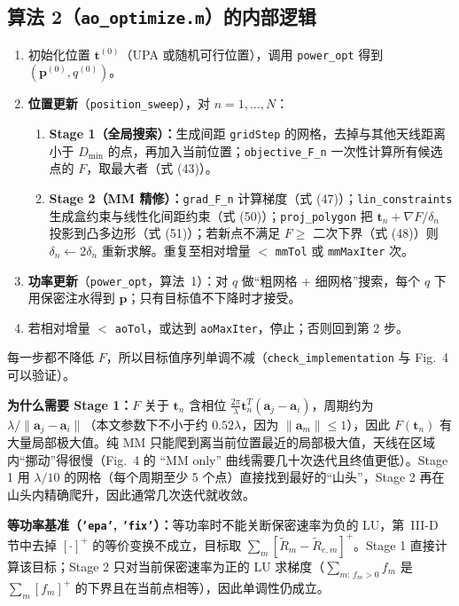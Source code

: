\documentclass[11pt,a4paper]{ctexart}
\newcommand{\code}[1]{\texttt{#1}}
\newcommand{\bt}{\mathbf t}
\begin{document}
\subsection{算法 2（\code{ao\_optimize.m}）的内部逻辑}
\begin{enumerate}
\item 初始化位置 $\bt^{(0)}$（UPA 或随机可行位置），调用 \code{power\_opt} 得到 $(\mathbf p^{(0)},q^{(0)})$。
\item \textbf{位置更新}（\code{position\_sweep}），对 $n=1,\dots,N$：
  \begin{enumerate}
  \item \textbf{Stage 1（全局搜索）：}生成间距 \code{gridStep} 的网格，去掉与其他天线距离小于 $D_{\min}$ 的点，再加入当前位置；\code{objective\_F\_n} 一次性计算所有候选点的 $F$，取最大者（式 (43)）。
  \item \textbf{Stage 2（MM 精修）：}\code{grad\_F\_n} 计算梯度（式 (47)）；\code{lin\_constraints} 生成盒约束与线性化间距约束（式 (50)）；\code{proj\_polygon} 把 $\bt_n+\nabla F/\delta_n$ 投影到凸多边形（式 (51)）；若新点不满足 $F\ge$ 二次下界（式 (48)）则 $\delta_n\leftarrow2\delta_n$ 重新求解。重复至相对增量 $<$ \code{mmTol} 或 \code{mmMaxIter} 次。
  \end{enumerate}
\item \textbf{功率更新}（\code{power\_opt}，算法~1）：对 $q$ 做“粗网格 + 细网格”搜索，每个 $q$ 下用保密注水得到 $\mathbf p$；只有目标值不下降时才接受。
\item 若相对增量 $<$ \code{aoTol}，或达到 \code{aoMaxIter}，停止；否则回到第 2 步。
\end{enumerate}
每一步都不降低 $F$，所以目标值序列单调不减（\code{check\_implementation} 与 Fig.~4 可以验证）。

\textbf{为什么需要 Stage 1：}$F$ 关于 $\bt_n$ 含相位 $\frac{2\pi}{\lambda}\bt_n^T(\mathbf a_j-\mathbf a_i)$，周期约为 $\lambda/\|\mathbf a_j-\mathbf a_i\|$（本文参数下不小于约 $0.52\lambda$，因为 $\|\mathbf a_m\|\le1$），因此 $F(\bt_n)$ 有大量局部极大值。纯 MM 只能爬到离当前位置最近的局部极大值，天线在区域内“挪动”得很慢（Fig.~4 的 “MM only” 曲线需要几十次迭代且终值更低）。Stage 1 用 $\lambda/10$ 的网格（每个周期至少 5 个点）直接找到最好的“山头”，Stage 2 再在山头内精确爬升，因此通常几次迭代就收敛。

\textbf{等功率基准（\code{'epa'}, \code{'fix'}）：}等功率时不能关断保密速率为负的 LU，第~III-D 节中去掉 $[\cdot]^+$ 的等价变换不成立，目标取 $\sum_m[\tilde R_m-\tilde R_{e,m}]^+$。Stage 1 直接计算该目标；Stage 2 只对当前保密速率为正的 LU 求梯度（$\sum_{m:\,f_m>0}f_m$ 是 $\sum_m[f_m]^+$ 的下界且在当前点相等），因此单调性仍成立。
\end{document}
